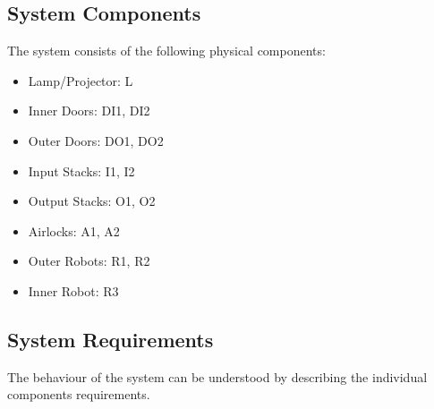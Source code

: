\documentclass[a4paper,12pt]{article}
\begin{document}
	\subsection{System Components}
	The system consists of the following physical components:
	\begin{itemize}
		\item Lamp/Projector: L
		\item Inner Doors: DI1, DI2
		\item Outer Doors: DO1, DO2
		\item Input Stacks: I1, I2
		\item Output Stacks: O1, O2
		\item Airlocks: A1, A2
		\item Outer Robots: R1, R2
		\item Inner Robot: R3
	\end{itemize}
	
	
	\subsection{System Requirements}
	The behaviour of the system can be understood by describing the individual components requirements.
	
\end{document}
